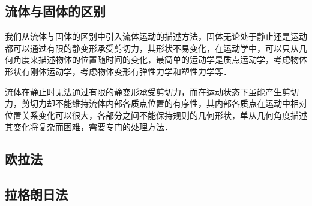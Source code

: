 \subsection{流体与固体的区别}
我们从流体与固体的区别中引入流体运动的描述方法，固体无论处于静止还是运动都可以通过有限的静变形承受剪切力，其形状不易变化，在运动学中，可以只从几何角度来描述物体的位置随时间的变化，最简单的运动学是质点运动学，考虑物体形状有刚体运动学，考虑物体变形有弹性力学和塑性力学等．

流体在静止时无法通过有限的静变形承受剪切力，而在运动状态下虽能产生剪切力，剪切力却不能维持流体内部各质点位置的有序性，其内部各质点在运动中相对位置关系变化可以很大，各部分之间不能保持规则的几何形状，单从几何角度描述其变化将复杂而困难，需要专门的处理方法．

\subsection{欧拉法}

\subsection{拉格朗日法}